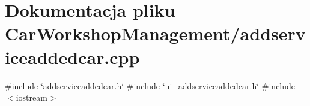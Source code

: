 \section{Dokumentacja pliku Car\+Workshop\+Management/addserviceaddedcar.cpp}
\label{addserviceaddedcar_8cpp}
{\ttfamily \#include \char`\"{}addserviceaddedcar.\+h\char`\"{}}\newline
{\ttfamily \#include \char`\"{}ui\+\_\+addserviceaddedcar.\+h\char`\"{}}\newline
{\ttfamily \#include $<$iostream$>$}\newline
